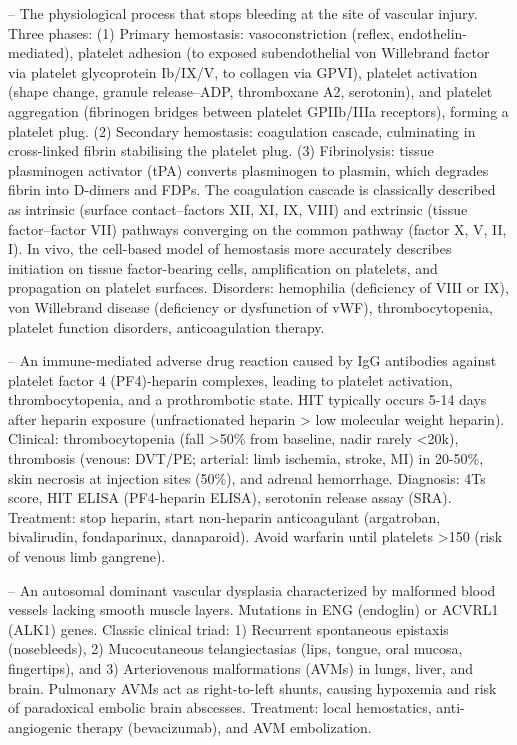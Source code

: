 -- The physiological process that stops bleeding at the site of vascular injury. Three phases: (1) Primary hemostasis: vasoconstriction (reflex, endothelin-mediated), platelet adhesion (to exposed subendothelial von Willebrand factor via platelet glycoprotein Ib/IX/V, to collagen via GPVI), platelet activation (shape change, granule release--ADP, thromboxane A2, serotonin), and platelet aggregation (fibrinogen bridges between platelet GPIIb/IIIa receptors), forming a platelet plug. (2) Secondary hemostasis: coagulation cascade, culminating in cross-linked fibrin stabilising the platelet plug. (3) Fibrinolysis: tissue plasminogen activator (tPA) converts plasminogen to plasmin, which degrades fibrin into D-dimers and FDPs. The coagulation cascade is classically described as intrinsic (surface contact--factors XII, XI, IX, VIII) and extrinsic (tissue factor--factor VII) pathways converging on the common pathway (factor X, V, II, I). In vivo, the cell-based model of hemostasis more accurately describes initiation on tissue factor-bearing cells, amplification on platelets, and propagation on platelet surfaces. Disorders: hemophilia (deficiency of VIII or IX), von Willebrand disease (deficiency or dysfunction of vWF), thrombocytopenia, platelet function disorders, anticoagulation therapy.

-- An immune-mediated adverse drug reaction caused by IgG antibodies against platelet factor 4 (PF4)-heparin complexes, leading to platelet activation, thrombocytopenia, and a prothrombotic state. HIT typically occurs 5-14 days after heparin exposure (unfractionated heparin > low molecular weight heparin). Clinical: thrombocytopenia (fall >50\% from baseline, nadir rarely <20k), thrombosis (venous: DVT/PE; arterial: limb ischemia, stroke, MI) in 20-50\%, skin necrosis at injection sites (50\%), and adrenal hemorrhage. Diagnosis: 4Ts score, HIT ELISA (PF4-heparin ELISA), serotonin release assay (SRA). Treatment: stop heparin, start non-heparin anticoagulant (argatroban, bivalirudin, fondaparinux, danaparoid). Avoid warfarin until platelets >150 (risk of venous limb gangrene).

-- An autosomal dominant vascular dysplasia characterized by malformed blood vessels lacking smooth muscle layers. Mutations in ENG (endoglin) or ACVRL1 (ALK1) genes. Classic clinical triad: 1) Recurrent spontaneous epistaxis (nosebleeds), 2) Mucocutaneous telangiectasias (lips, tongue, oral mucosa, fingertips), and 3) Arteriovenous malformations (AVMs) in lungs, liver, and brain. Pulmonary AVMs act as right-to-left shunts, causing hypoxemia and risk of paradoxical embolic brain abscesses. Treatment: local hemostatics, anti-angiogenic therapy (bevacizumab), and AVM embolization.

